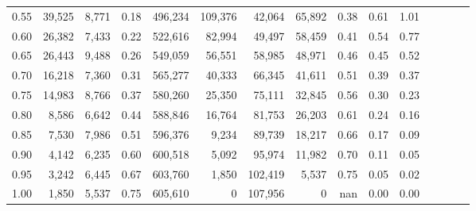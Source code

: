 \begin{tabular}{rrrcrrrrrrrrrrr}
0.55 &  39,525 &  8,771 &                                       0.18 &  496,234 &  109,376 &   42,064 &   65,892 &  0.38 &  0.61 &                         1.01 \\
0.60 &  26,382 &  7,433 &                                       0.22 &  522,616 &   82,994 &   49,497 &   58,459 &  0.41 &  0.54 &                         0.77 \\
0.65 &  26,443 &  9,488 &                                       0.26 &  549,059 &   56,551 &   58,985 &   48,971 &  0.46 &  0.45 &                         0.52 \\
0.70 &  16,218 &  7,360 &                                       0.31 &  565,277 &   40,333 &   66,345 &   41,611 &  0.51 &  0.39 &                         0.37 \\
0.75 &  14,983 &  8,766 &                                       0.37 &  580,260 &   25,350 &   75,111 &   32,845 &  0.56 &  0.30 &                         0.23 \\
0.80 &   8,586 &  6,642 &                                       0.44 &  588,846 &   16,764 &   81,753 &   26,203 &  0.61 &  0.24 &                         0.16 \\
0.85 &   7,530 &  7,986 &                                       0.51 &  596,376 &    9,234 &   89,739 &   18,217 &  0.66 &  0.17 &                         0.09 \\
0.90 &   4,142 &  6,235 &                                       0.60 &  600,518 &    5,092 &   95,974 &   11,982 &  0.70 &  0.11 &                         0.05 \\
0.95 &   3,242 &  6,445 &                                       0.67 &  603,760 &    1,850 &  102,419 &    5,537 &  0.75 &  0.05 &                         0.02 \\
1.00 &   1,850 &  5,537 &                                       0.75 &  605,610 &        0 &  107,956 &        0 &   nan &  0.00 &                         0.00 \\
\bottomrule
\end{tabular}
